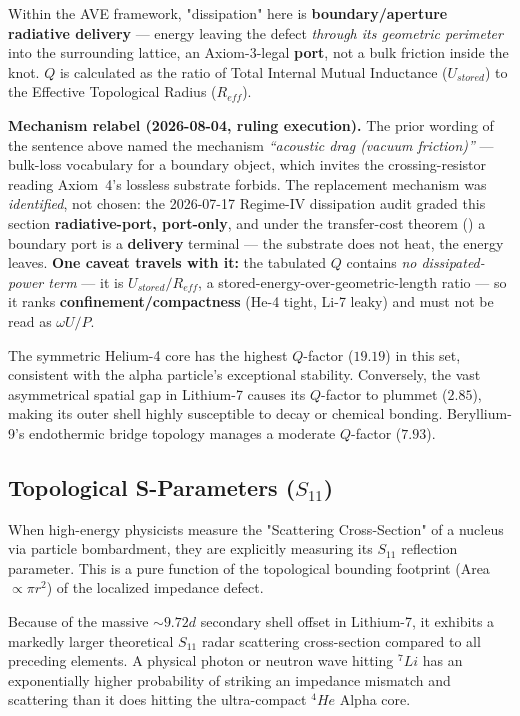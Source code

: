 Within the AVE framework, "dissipation" here is \textbf{boundary/aperture radiative delivery} --- energy leaving the defect \emph{through its geometric perimeter} into the surrounding lattice, an Axiom-3-legal \textbf{port}, not a bulk friction inside the knot. $Q$ is calculated as the ratio of Total Internal Mutual Inductance ($U_{stored}$) to the Effective Topological Radius ($R_{eff}$).

\noindent\textbf{Mechanism relabel (2026-08-04, ruling execution).} The prior wording of the sentence above named the mechanism \emph{``acoustic drag (vacuum friction)''} --- bulk-loss vocabulary for a boundary object, which invites the crossing-resistor reading Axiom~4's lossless substrate forbids. The replacement mechanism was \emph{identified}, not chosen: the 2026-07-17 Regime-IV dissipation audit graded this section \textbf{radiative-port, port-only}, and under the transfer-cost theorem () a boundary port is a \textbf{delivery} terminal --- the substrate does not heat, the energy leaves. \textbf{One caveat travels with it:} the tabulated $Q$ contains \emph{no dissipated-power term} --- it is $U_{stored}/R_{eff}$, a stored-energy-over-geometric-length ratio --- so it ranks \textbf{confinement/compactness} (He-4 tight, Li-7 leaky) and must not be read as $\omega U/P$.

The symmetric Helium-4 core has the highest $Q$-factor ($19.19$) in this set, consistent with the alpha particle's exceptional stability. Conversely, the vast asymmetrical spatial gap in Lithium-7 causes its $Q$-factor to plummet ($2.85$), making its outer shell highly susceptible to decay or chemical bonding. Beryllium-9's endothermic bridge topology manages a moderate $Q$-factor ($7.93$).

\subsection{Topological S-Parameters ($S_{11}$)}
When high-energy physicists measure the "Scattering Cross-Section" of a nucleus via particle bombardment, they are explicitly measuring its $S_{11}$ reflection parameter. This is a pure function of the topological bounding footprint (Area $\propto \pi r^2$) of the localized impedance defect.

Because of the massive $\sim 9.72d$ secondary shell offset in Lithium-7, it exhibits a markedly larger theoretical $S_{11}$ radar scattering cross-section compared to all preceding elements. A physical photon or neutron wave hitting $^7Li$ has an exponentially higher probability of striking an impedance mismatch and scattering than it does hitting the ultra-compact $^4He$ Alpha core.


